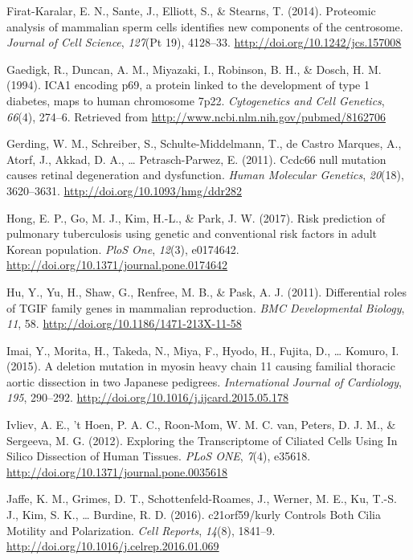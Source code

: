 \documentclass[12pt,twoside]{reedthesis}
\theoremstyle{definition}
\theoremstyle{definition}
\theoremstyle{remark}
\begin{document}
  \hypertarget{ref-Firat-Karalar2014}{}
  Firat-Karalar, E. N., Sante, J., Elliott, S., \& Stearns, T. (2014).
  Proteomic analysis of mammalian sperm cells identifies new components of
  the centrosome. \emph{Journal of Cell Science}, \emph{127}(Pt 19),
  4128--33. \url{http://doi.org/10.1242/jcs.157008}
  
  \hypertarget{ref-Gaedigk1994}{}
  Gaedigk, R., Duncan, A. M., Miyazaki, I., Robinson, B. H., \& Dosch, H.
  M. (1994). ICA1 encoding p69, a protein linked to the development of
  type 1 diabetes, maps to human chromosome 7p22. \emph{Cytogenetics and
  Cell Genetics}, \emph{66}(4), 274--6. Retrieved from
  \url{http://www.ncbi.nlm.nih.gov/pubmed/8162706}
  
  \hypertarget{ref-Gerding2011}{}
  Gerding, W. M., Schreiber, S., Schulte-Middelmann, T., de Castro
  Marques, A., Atorf, J., Akkad, D. A., \ldots{} Petrasch-Parwez, E.
  (2011). Ccdc66 null mutation causes retinal degeneration and
  dysfunction. \emph{Human Molecular Genetics}, \emph{20}(18), 3620--3631.
  \url{http://doi.org/10.1093/hmg/ddr282}
  
  \hypertarget{ref-Hong2017}{}
  Hong, E. P., Go, M. J., Kim, H.-L., \& Park, J. W. (2017). Risk
  prediction of pulmonary tuberculosis using genetic and conventional risk
  factors in adult Korean population. \emph{PloS One}, \emph{12}(3),
  e0174642. \url{http://doi.org/10.1371/journal.pone.0174642}
  
  \hypertarget{ref-Hu2011}{}
  Hu, Y., Yu, H., Shaw, G., Renfree, M. B., \& Pask, A. J. (2011).
  Differential roles of TGIF family genes in mammalian reproduction.
  \emph{BMC Developmental Biology}, \emph{11}, 58.
  \url{http://doi.org/10.1186/1471-213X-11-58}
  
  \hypertarget{ref-Imai2015}{}
  Imai, Y., Morita, H., Takeda, N., Miya, F., Hyodo, H., Fujita, D.,
  \ldots{} Komuro, I. (2015). A deletion mutation in myosin heavy chain 11
  causing familial thoracic aortic dissection in two Japanese pedigrees.
  \emph{International Journal of Cardiology}, \emph{195}, 290--292.
  \url{http://doi.org/10.1016/j.ijcard.2015.05.178}
  
  \hypertarget{ref-Ivliev2012}{}
  Ivliev, A. E., 't Hoen, P. A. C., Roon-Mom, W. M. C. van, Peters, D. J.
  M., \& Sergeeva, M. G. (2012). Exploring the Transcriptome of Ciliated
  Cells Using In Silico Dissection of Human Tissues. \emph{PLoS ONE},
  \emph{7}(4), e35618. \url{http://doi.org/10.1371/journal.pone.0035618}
  
  \hypertarget{ref-Jaffe2016}{}
  Jaffe, K. M., Grimes, D. T., Schottenfeld-Roames, J., Werner, M. E., Ku,
  T.-S. J., Kim, S. K., \ldots{} Burdine, R. D. (2016). c21orf59/kurly
  Controls Both Cilia Motility and Polarization. \emph{Cell Reports},
  \emph{14}(8), 1841--9. \url{http://doi.org/10.1016/j.celrep.2016.01.069}
  
\end{document}
